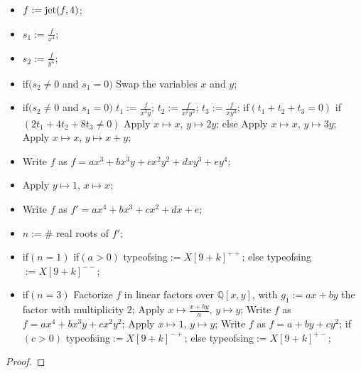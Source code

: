 \documentclass{amsproc}
\begin{document}
\begin{itemize}
\item $f:=\textnormal{jet}(f,4)$;
\item $s_1:=\frac{f}{x^4}$;
\item $s_2:=\frac{f}{y^4}$;
\item if$(s_2\neq0$ and $s_1=0)$\newline
\phantom{}\quad Swap the variables $x$ and $y$;\newline
\item if$(s_2\neq0$ and $s_1=0)$\newline
\phantom{}\quad $t_1:=\frac{f}{x^3y}$;\newline
\phantom{}\quad $t_2:=\frac{f}{x^2y^2}$;\newline
\phantom{}\quad $t_3:=\frac{f}{xy^3}$;\newline
\phantom{}\quad if$(t_1+t_2+t_3=0)$\newline
\phantom{}\quad\quad if$(2t_1+4t_2+8t_3\neq0)$\newline
\phantom{}\quad\quad\quad Apply $x\mapsto x$, $y\mapsto 2y$;\newline
\phantom{}\quad\quad else\newline
\phantom{}\quad\quad\quad Apply $x\mapsto x$, $y\mapsto 3y$;\newline
\phantom{}\quad Apply $x\mapsto x$, $y\mapsto x+y$;
\item Write $f$ as $f=ax^3+bx^3y+cx^2y^2+dxy^3+ey^4$;
\item Apply $y\mapsto 1$, $x\mapsto x$;
\item Write $f$ as $f'=ax^4+bx^3+cx^2+dx+e;$
\item $n:=\#$ real roots of $f'$; 
\item if$(n=1)$\newline
\phantom{}\quad if$(a>0)$\newline
\phantom{}\quad\quad typeofsing$:=X[9+k]^{++}$;\newline
\phantom{}\quad else\newline
\phantom{}\quad\quad typeofsing$:=X[9+k]^{--}$;
\item if$(n=3)$\newline
\phantom{}\quad Factorize $f$ in linear factors over $\mathbb Q[x,y]$, with $g_1:=ax+by$ the factor\newline
\phantom{}\quad with multiplicity $2$;\newline
\phantom{}\quad Apply $x\mapsto\frac{x+by}{a}$, $y\mapsto y$;\newline
\phantom{}\quad Write $f$ as $f=ax^4+bx^3y+cx^2y^2$;\newline
\phantom{}\quad Apply $x\mapsto 1$, $y\mapsto y$;\newline
\phantom{}\quad Write $f$ as $f=a+by+cy^2$;\newline
\phantom{}\quad if$(c>0)$\newline
\phantom{}\quad\quad typeofsing$:= X[9+k]^{-+}$;\newline
\phantom{}\quad else\newline
\phantom{}\quad\quad typeofsing$:=X[9+k]^{+-}$;
\end{itemize}
\begin{proof}

\end{proof}
\end{document}
